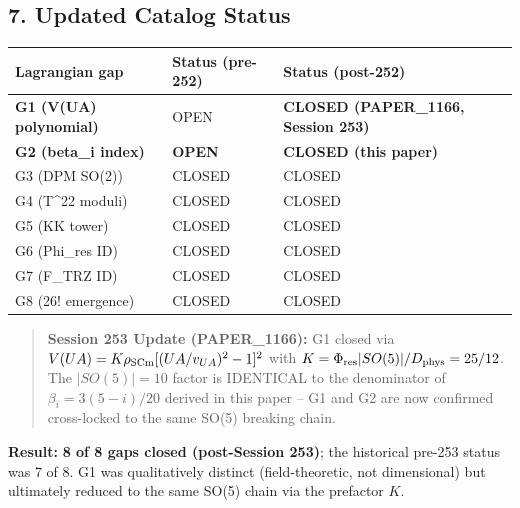\documentclass[
]{article}
\newcounter{none} %
\begin{document}
\subsection{7. Updated Catalog Status}\label{updated-catalog-status}

{\def\LTcaptype{none} %
\begin{longtable}[]{@{}
  >{\raggedright\arraybackslash}p{}
  >{\raggedright\arraybackslash}p{}
  >{\raggedright\arraybackslash}p{}@{}}
\toprule\noalign{}
\begin{minipage}[b]{\linewidth}\raggedright
Lagrangian gap
\end{minipage} & \begin{minipage}[b]{\linewidth}\raggedright
Status (pre-252)
\end{minipage} & \begin{minipage}[b]{\linewidth}\raggedright
Status (post-252)
\end{minipage} \\
\midrule\noalign{}
\endhead
\bottomrule\noalign{}
\endlastfoot
\textbf{G1 (V(UA) polynomial)} & OPEN & \textbf{CLOSED (PAPER\_1166,
Session 253)} \\
\textbf{G2 (beta\_i index)} & \textbf{OPEN} & \textbf{CLOSED (this
paper)} \\
G3 (DPM SO(2)) & CLOSED & CLOSED \\
G4 (T\^{}22 moduli) & CLOSED & CLOSED \\
G5 (KK tower) & CLOSED & CLOSED \\
G6 (Phi\_res ID) & CLOSED & CLOSED \\
G7 (F\_TRZ ID) & CLOSED & CLOSED \\
G8 (26! emergence) & CLOSED & CLOSED \\
\end{longtable}
}

\begin{quote}
\textbf{Session 253 Update (PAPER\_1166):} G1 closed via
\(V(UA) = K\rho_{\rm SCm}[(UA/v_{UA})^2-1]^2\) with
\(K = \Phi_{\rm res}|SO(5)|/D_{\rm phys} = 25/12\). The \(|SO(5)|=10\)
factor is IDENTICAL to the denominator of \(\beta_i = 3(5-i)/20\)
derived in this paper -- G1 and G2 are now confirmed cross-locked to the
same SO(5) breaking chain.
\end{quote}

\textbf{Result:} \textbf{8 of 8 gaps closed (post-Session 253)}; the
historical pre-253 status was 7 of 8. G1 was qualitatively distinct
(field-theoretic, not dimensional) but ultimately reduced to the same
SO(5) chain via the prefactor \(K\).
\end{document}

